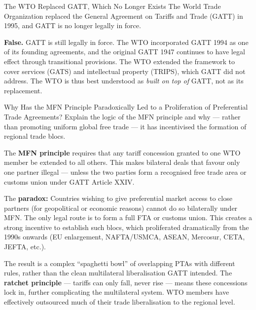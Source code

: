 \documentclass[paper=a5]{scrartcl}
\begin{document}
\begin{question}[type=tf]{The WTO Replaced GATT, Which No Longer Exists}
The World Trade Organization replaced the General Agreement on Tariffs and
Trade (GATT) in 1995, and GATT is no longer legally in force.
\truefalse[false]
\begin{solution}
  \textbf{False.} GATT is still legally in force. The WTO incorporated
  GATT 1994 as one of its founding agreements, and the original GATT 1947
  continues to have legal effect through transitional provisions. The
  WTO extended the framework to cover services (GATS) and intellectual
  property (TRIPS), which GATT did not address. The WTO is thus best
  understood as \emph{built on top of} GATT, not as its replacement.
\end{solution}
\end{question}

\begin{question}[type=open]{Why Has the MFN Principle Paradoxically Led to a
  Proliferation of Preferential Trade Agreements?}
Explain the logic of the MFN principle and why --- rather than promoting
uniform global free trade --- it has incentivised the formation of regional
trade blocs.

\answerlines[6]

\begin{solution}
  The \textbf{MFN principle} requires that any tariff concession granted to
  one WTO member be extended to all others. This makes bilateral deals that
  favour only one partner illegal --- unless the two parties form a recognised
  free trade area or customs union under GATT Article XXIV.

  The \textbf{paradox:} Countries wishing to give preferential market access
  to close partners (for geopolitical or economic reasons) cannot do so
  bilaterally under MFN. The only legal route is to form a full FTA or
  customs union. This creates a strong incentive to establish such blocs,
  which proliferated dramatically from the 1990s onwards (EU enlargement,
  NAFTA/USMCA, ASEAN, Mercosur, CETA, JEFTA, etc.).

  The result is a complex ``spaghetti bowl'' of overlapping PTAs with
  different rules, rather than the clean multilateral liberalisation GATT
  intended. The \textbf{ratchet principle} --- tariffs can only fall, never
  rise --- means these concessions lock in, further complicating the
  multilateral system. WTO members have effectively outsourced much of
  their trade liberalisation to the regional level.
\end{solution}
\end{question}
\end{document}
